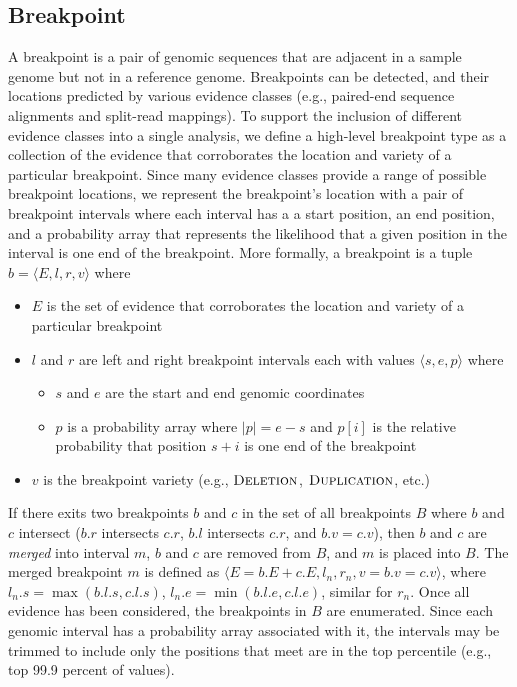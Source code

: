 \documentclass[11pt]{article}
\begin{document}
\subsection{Breakpoint}

A breakpoint is a pair of genomic sequences that are adjacent in a sample genome
but not in a reference genome. Breakpoints can be detected, and their locations
predicted by various evidence classes (e.g., paired-end sequence alignments and
split-read mappings).  To support the inclusion of different evidence classes
into a single analysis, we define a high-level breakpoint type as a collection
of the evidence that corroborates the location and variety of a particular
breakpoint.  Since many evidence classes provide a range of possible breakpoint
locations, we represent the breakpoint's location with a pair of breakpoint
intervals where each interval has a a start position, an end position, and a
probability array that represents the likelihood that a given position in the
interval is one end of the breakpoint.  More formally, a breakpoint is a tuple 
$b=\langle E,l,r,v \rangle$ where
\begin{itemize}
\item $E$ is the set of evidence that corroborates the location and variety of a
particular breakpoint
\item $l$ and $r$ are left and right breakpoint intervals each with values
	$\langle s, e, p \rangle$ where
	\begin{itemize}
		\item $s$ and $e$ are the start and end genomic coordinates
		\item $p$ is a probability array where $|p|=e-s$ and $p[i]$ is the
		relative probability that position $s+i$ is one end of the breakpoint
	\end{itemize}
\item  $v$ is the breakpoint variety (e.g., $\textsc{Deletion}$,
$\textsc{Duplication}$, etc.)
\end{itemize}

If there exits two breakpoints $b$ and $c$ in the set of all breakpoints $B$
where $b$ and $c$  intersect ($b.r$ intersects $c.r$, $b.l$ intersects $c.r$,
and $b.v = c.v$), then $b$ and $c$ are {\em merged} into interval $m$, $b$ and
$c$ are removed from $B$, and $m$ is placed into $B$.  The merged breakpoint $m$ is defined as $\langle E = b.E + c.E, l_n, r_n, v = b.v = c.v\rangle$, where 
$l_n.s = \max(b.l.s, c.l.s)$, $l_n.e = \min(b.l.e, c.l.e)$, similar for $r_n$.
Once all evidence has been considered, the breakpoints in $B$ are enumerated.
Since each genomic interval has a probability array associated with it, the
intervals may be trimmed to include only the positions that meet are in the top
percentile (e.g., top 99.9 percent of values).
\end{document}
